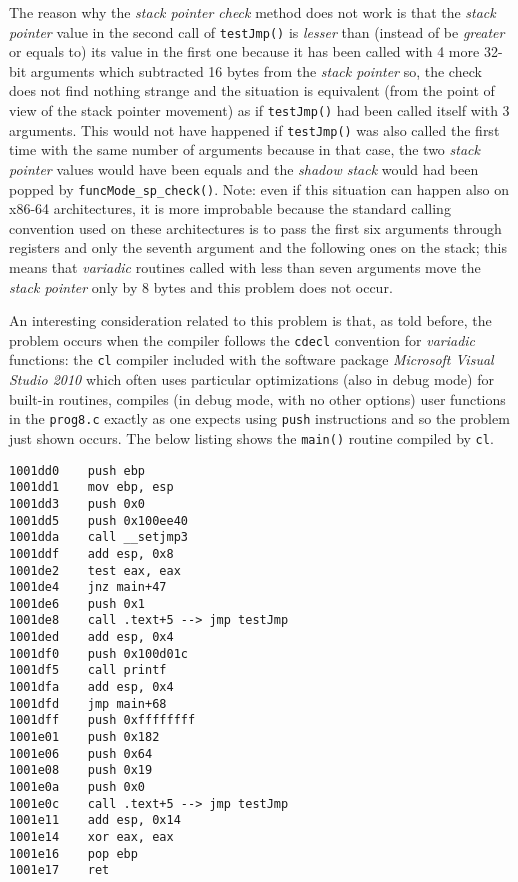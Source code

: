 \documentclass[a4paper,10pt]{report}
\begin{document}
The reason why the \emph{stack pointer check} method does not work is that
the \emph{stack pointer} value in the second call of \verb|testJmp()| is \emph{lesser}
than (instead of be \emph{greater} or equals to)
its value in the first one because it has been called with 4 more 32-bit arguments
which subtracted 16 bytes from the \emph{stack pointer} so, the check does not
find nothing strange and the situation is equivalent (from the point of view of the stack pointer movement) as if \verb|testJmp()| had been called itself with 3 arguments.
This would not have happened if \verb|testJmp()| was also called the first time with
the same number of arguments because in that case, the two \emph{stack pointer} values
would have been equals and the \emph{shadow stack} would had been popped
by \verb|funcMode_sp_check()|. Note: even if this situation can happen also
on x86-64 architectures, it is more improbable because the standard calling convention
used on these architectures is to pass the first six arguments through registers
and only the seventh argument and the following ones on the stack; this means
that \emph{variadic} routines called with less than seven arguments move
the \emph{stack pointer} only by 8 bytes and this problem does not occur.

An interesting consideration related to this problem is that, as told before,
the problem occurs when the compiler follows the \verb|cdecl|
convention for \emph{variadic} functions:
the \verb|cl| compiler included with the software package
\emph{Microsoft Visual Studio 2010} which often uses particular optimizations (also in debug mode) for built-in routines, compiles (in debug mode, with no other options)
user functions in the \verb|prog8.c| exactly as one expects using \verb|push| instructions
and so the problem just shown occurs. The below listing shows the \verb|main()| routine
compiled by \verb|cl|.

\begin{lstlisting}[language={[x86masm]Assembler},
	label=p8mainCL, caption={\texttt{main()} disassembly of \texttt{prog8.c} compiled with \texttt{cl}}, frame=leftline]
1001dd0    push ebp
1001dd1    mov ebp, esp
1001dd3    push 0x0
1001dd5    push 0x100ee40
1001dda    call __setjmp3
1001ddf    add esp, 0x8
1001de2    test eax, eax
1001de4    jnz main+47
1001de6    push 0x1
1001de8    call .text+5 --> jmp testJmp
1001ded    add esp, 0x4
1001df0    push 0x100d01c
1001df5    call printf
1001dfa    add esp, 0x4
1001dfd    jmp main+68
1001dff    push 0xffffffff
1001e01    push 0x182
1001e06    push 0x64
1001e08    push 0x19
1001e0a    push 0x0
1001e0c    call .text+5 --> jmp testJmp
1001e11    add esp, 0x14
1001e14    xor eax, eax
1001e16    pop ebp
1001e17    ret
\end{lstlisting}
\end{document}
